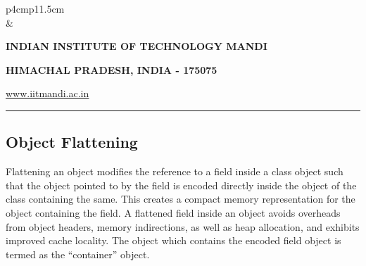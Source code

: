 \documentclass[12 pt, a4paper]{article}
\newcommand{\HRule}{\rule{\linewidth}{1mm}}
\begin{document}
\clearpage

\pagestyle{empty}
\vskip 0.2cm
	\begin{tabular}{p{4cm}p{11.5cm}}
		  \\
		& \centering \large\bf\phantom{Empty line}\\ 
		\rule{0pt}{1pt} \centering \large\bf{INDIAN INSTITUTE OF TECHNOLOGY MANDI} \\
		\rule{0pt}{1pt} \centering \large\bf{HIMACHAL PRADESH, INDIA - 175075} \\
		\rule{0pt}{1pt} \centering \underline{\href{www.iitmandi.ac.in}{www.iitmandi.ac.in}}\\
	\end{tabular}
\noindent

{\raggedleft{}\HRule}

\subsection{Object Flattening}
Flattening an object modifies the reference to a field inside a class object 
such that the object pointed to by the field is encoded directly inside the 
object of the class containing the same. This creates a compact memory representation
for the object containing the field.  
A flattened field inside an object avoids overheads from object headers, 
memory indirections, as well as heap allocation, and exhibits improved cache locality.
The object which contains the encoded
field object is termed as the ``container'' object. 
\end{document}
